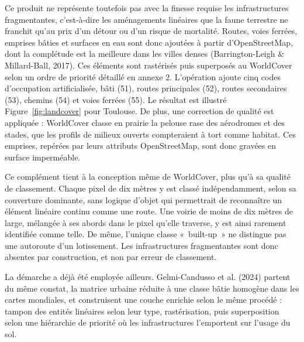 \documentclass[a4paper,12pt]{report}
\begin{document}
Ce produit ne représente toutefois pas avec la finesse requise les infrastructures fragmentantes, c'est-à-dire les aménagements linéaires que la faune terrestre ne franchit qu'au prix d'un détour ou d'un risque de mortalité. Routes, voies ferrées, emprises bâties et surfaces en eau sont donc ajoutées à partir d'OpenStreetMap, dont la complétude est la meilleure dans les villes denses (Barrington-Leigh \& Millard-Ball, 2017). Ces éléments sont rastérisés puis superposés au WorldCover selon un ordre de priorité détaillé en annexe 2. L'opération ajoute cinq codes d'occupation artificialisée, bâti (51), routes principales (52), routes secondaires (53), chemins (54) et voies ferrées (55). Le résultat est illustré Figure~\ref{fig:landcover} pour Toulouse. De plus, une correction de qualité est appliquée : WorldCover classe en prairie la pelouse rase des aérodromes et des stades, que les profils de milieux ouverts compteraient à tort comme habitat. Ces emprises, repérées par leurs attributs OpenStreetMap, sont donc gravées en surface imperméable.

Ce complément tient à la conception même de WorldCover, plus qu'à sa qualité de classement. Chaque pixel de dix mètres y est classé indépendamment, selon sa couverture dominante, sans logique d'objet qui permettrait de reconnaître un élément linéaire continu comme une route. Une voirie de moins de dix mètres de large, mélangée à ses abords dans le pixel qu'elle traverse, y est ainsi rarement identifiée comme telle. De même, l'unique classe «~built-up~» ne distingue pas une autoroute d'un lotissement. Les infrastructures fragmentantes sont donc absentes par construction, et non par erreur de classement.

La démarche a déjà été employée ailleurs. Gelmi-Candusso et al. (2024) partent du même constat, la matrice urbaine réduite à une classe bâtie homogène dans les cartes mondiales, et construisent une couche enrichie selon le même procédé : tampon des entités linéaires selon leur type, rastérisation, puis superposition selon une hiérarchie de priorité où les infrastructures l'emportent sur l'usage du sol.
\end{document}
